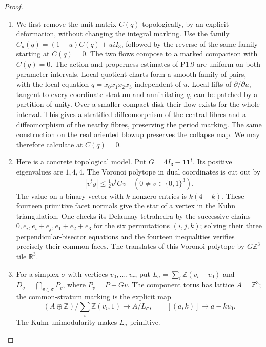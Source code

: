 \documentclass[11pt,a4paper]{article}
\theoremstyle{definition}
\begin{document}
\begin{proof}
\begin{enumerate}[label=\arabic*.]
\item We first remove the unit matrix $C(q)$ topologically, by an explicit
deformation, without changing the integral marking.  Use the family
$C_u(q)=(1-u)C(q)+u iI_3$, followed by the reverse of the same
family starting at $C(q)=0$.  The two flows compose to a marked
comparison with $C(q)=0$.  The action and properness estimates
of P1.9 are uniform on both parameter intervals.  Local quotient charts form a smooth
family of pairs, with the local equation $q=x_0x_1x_2x_3$ independent
of $u$.  Local lifts of $\partial/\partial u$, tangent to every
coordinate stratum and annihilating $q$, can be patched by a partition
of unity.  Over a smaller compact disk their flow exists for the whole
interval.  This gives a stratified diffeomorphism of the central
fibres and a diffeomorphism of the nearby fibres, preserving the
period marking.  The same construction on the real oriented blowup
preserves the collapse map.  We may therefore calculate at $C(q)=0$.

\item Here is a concrete topological model.  Put $G=4I_3-\mathbf1\mathbf1^t$.
Its positive eigenvalues are $1,4,4$.  The Voronoi polytope in dual
coordinates is cut out by
\[
|v^ty|\leq \tfrac12v^tGv
 \quad (0\ne v\in\{0,1\}^3).
\]
The value on a binary vector with $k$ nonzero entries is $k(4-k)$.
These fourteen primitive facet normals give the star of a vertex in
the Kuhn triangulation.  One checks its Delaunay tetrahedra by the
successive chains
$0,e_i,e_i+e_j,e_1+e_2+e_3$ for the six permutations $(i,j,k)$;
solving their three perpendicular-bisector equations and the fourteen
inequalities verifies precisely their common faces.  The translates
of this Voronoi polytope by $G\mathbb Z^3$ tile $\mathbb R^3$.

\item For a simplex $\sigma$ with vertices $v_0,\ldots,v_r$, put
$L_\sigma=\sum_i\mathbb Z(v_i-v_0)$ and
$D_\sigma=\bigcap_{v\in\sigma}P_v$, where $P_v=P+Gv$.
The component torus has lattice $A=\mathbb Z^3$; the common-stratum
marking is the explicit map
\[
 (A\oplus\mathbb Z)/\sum_i\mathbb Z(v_i,1)
 \longrightarrow A/L_\sigma,\qquad
 [(a,k)]\longmapsto a-kv_0.
\]
The Kuhn unimodularity makes $L_\sigma$ primitive.


\end{enumerate}
\end{proof}
\end{document}
